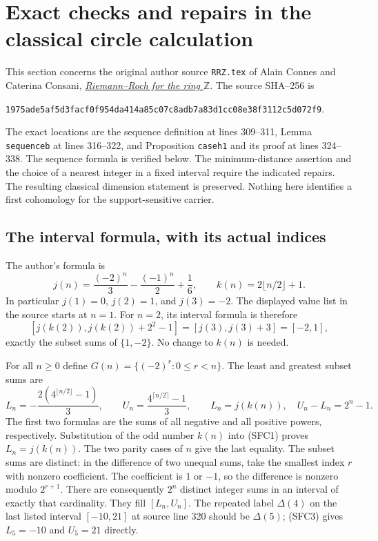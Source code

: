 \section{Exact checks and repairs in the classical circle calculation}
\label{sec:cc-circle-formula-checks}

This section concerns the original author source \nolinkurl{RRZ.tex} of
Alain Connes and Caterina Consani,
\href{https://arxiv.org/abs/2306.00456}{\emph{Riemann--Roch for the ring
$\mathbb Z$}}. The source SHA--256 is
\par\noindent
\nolinkurl{1975ade5af5d3facf0f954da414a85c07c8adb7a83d1cc08e38f3112c5d072f9}.
\par\noindent
The exact locations are the sequence definition at lines 309--311,
Lemma \texttt{sequenceb} at lines 316--322, and Proposition
\texttt{caseh1} and its proof at lines 324--338. The sequence formula
is verified below. The minimum-distance assertion and the choice of
a nearest integer in a fixed interval require the indicated repairs.
The resulting classical dimension statement is preserved. Nothing
here identifies a first cohomology for the support-sensitive carrier.

\subsection{The interval formula, with its actual indices}

The author's formula is
\begin{equation}\tag{SFC1}
 j(n)=\frac{(-2)^n}{3}-\frac{(-1)^n}{2}+\frac16,
 \qquad k(n)=2\lfloor n/2\rfloor+1.
\end{equation}
In particular $j(1)=0$, $j(2)=1$, and $j(3)=-2$. The displayed
value list in the source starts at $n=1$. For $n=2$, its interval
formula is therefore
\begin{equation}\tag{SFC2}
 [j(k(2)),j(k(2))+2^2-1]=[j(3),j(3)+3]=[-2,1],
\end{equation}
exactly the subset sums of $\{1,-2\}$. No change to $k(n)$ is needed.

For all $n\ge0$ define $G(n)=\{(-2)^r:0\le r<n\}$. The least
and greatest subset sums are
\begin{equation}\tag{SFC3}
 L_n=-\frac{2(4^{\lfloor n/2\rfloor}-1)}3,
 \qquad U_n=\frac{4^{\lceil n/2\rceil}-1}3,
 \qquad L_n=j(k(n)),\quad U_n-L_n=2^n-1.
\end{equation}
The first two formulas are the sums of all negative and all positive
powers, respectively. Substitution of the odd number $k(n)$ into
(SFC1) proves $L_n=j(k(n))$. The two parity cases of $n$ give the
last equality. The subset sums are distinct: in the difference of
two unequal sums, take the smallest index $r$ with nonzero coefficient.
The coefficient is $1$ or $-1$, so the difference is nonzero modulo
$2^{r+1}$. There are consequently $2^n$ distinct integer sums in an
interval of exactly that cardinality. They fill $[L_n,U_n]$.
The repeated label $\Delta(4)$ on the last listed interval
$[-10,21]$ at source line 320 should be $\Delta(5)$; (SFC3)
gives $L_5=-10$ and $U_5=21$ directly.

